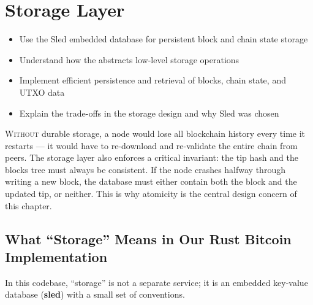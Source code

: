 \chapter{Storage Layer}
\label{ch:storage}

\begin{learnbox}
\begin{itemize}
  \item Use the Sled embedded database for persistent block and chain state storage
  \item Understand how the  abstracts low-level storage operations
  \item Implement efficient persistence and retrieval of blocks, chain state, and UTXO data
  \item Explain the trade-offs in the storage design and why Sled was chosen
\end{itemize}
\end{learnbox}

\lettrine{W}{ithout} durable storage, a node would lose all blockchain history every time it restarts --- it would have to re-download and re-validate the entire chain from peers. The storage layer also enforces a critical invariant: the tip hash and the blocks tree must always be consistent. If the node crashes halfway through writing a new block, the database must either contain both the block and the updated tip, or neither. This is why atomicity is the central design concern of this chapter.

\section{What ``Storage'' Means in Our Rust Bitcoin Implementation}
\label{sec:ch11-what-storage-means}

In this codebase, ``storage'' is not a separate service; it is an embedded key-value database (\textbf{sled}) with a small set of conventions.

